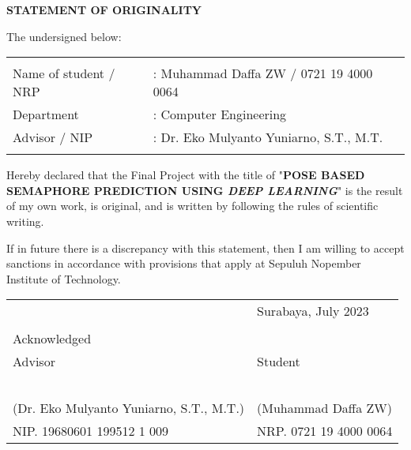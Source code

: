 \begin{center}
  \large
  \textbf{STATEMENT OF ORIGINALITY}
\end{center}

\thispagestyle{empty}

\vspace{2ex}


\noindent The undersigned below:

\noindent\begin{tabularx}{\textwidth}{X X l}
  & \\
  Name of student / NRP &: Muhammad Daffa ZW / 0721 19 4000 0064  \\
  Department &: Computer Engineering \\
  Advisor / NIP &: Dr. Eko Mulyanto Yuniarno, S.T., M.T. \\
  & \\
\end{tabularx}

Hereby declared that the Final Project with the title of "\textbf{POSE BASED SEMAPHORE PREDICTION USING \emph{DEEP LEARNING}}" is the result of my own work, is original, and is written by following the rules of scientific writing.

If in future there is a discrepancy with this statement, then I am willing to accept sanctions in accordance with provisions that apply at Sepuluh Nopember Institute of Technology.

\vspace{8ex}

\noindent\begin{tabularx}{\textwidth}{X l}
  & Surabaya, July 2023\\
  & \\
  Acknowledged & \\
  Advisor & Student\\
  & \\
  & \\
  & \\
  & \\
  & \\
  (Dr. Eko Mulyanto Yuniarno, S.T., M.T.) & (Muhammad Daffa ZW) \\
  NIP. 19680601 199512 1 009 & NRP. 0721 19 4000 0064 \\
\end{tabularx}